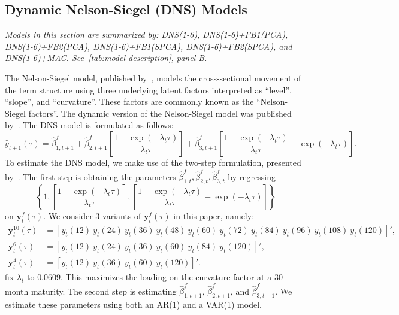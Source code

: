 \subsection{Dynamic Nelson-Siegel (DNS) Models}
\label{sec:dns}
\textit{Models in this section are summarized by: DNS(1-6), DNS(1-6)+FB1(PCA), DNS(1-6)+FB2(PCA), DNS(1-6)+FB1(SPCA), DNS(1-6)+FB2(SPCA), and DNS(1-6)+MAC. See~\cref{tab:model-description}, panel B.}

The Nelson-Siegel model, published by~\textcite{nelson_parsimonious_1987}, models the cross-sectional movement of the term structure using three underlying latent factors interpreted as \enquote{level}, \enquote{slope}, and \enquote{curvature}. 
These factors are commonly known as the \enquote{Nelson-Siegel factors}. 
The dynamic version of the Nelson-Siegel model was published by~\textcite[hereafter DNS]{diebold_forecasting_2006}. 
The DNS model is formulated as follows:
\begin{equation}
	\hat{y}_{t+1}(\tau) = \hat{\beta}_{1,t+1}^{f} + \hat{\beta}_{2,t+1}^{f} \left[\frac{1-\exp(-\lambda_t \tau)}{\lambda_t \tau}\right] + \hat{\beta}_{3,t+1}^{f} \left[\frac{1-\exp(-\lambda_t \tau)}{\lambda_t \tau} - \exp(-\lambda_t \tau)\right].
\end{equation}
To estimate the DNS model, we make use of the two-step formulation, presented by~\textcite{diebold_forecasting_2006}. 
The first step is obtaining the parameters $\hat{\beta}_{1,t}^f, \hat{\beta}_{2,t}^f, \hat{\beta}_{3,t}^f$ by regressing $$\left\{1, \left[\frac{1-\exp(-\lambda_t \tau)}{\lambda_t \tau}\right], \left[\frac{1-\exp(-\lambda_t \tau)}{\lambda_t \tau} - \exp(-\lambda_t \tau)\right] \right\}$$ on $\mathbf{y}_t^f(\tau)$.
We consider 3 variants of $\mathbf{y}_t^f(\tau)$ in this paper, namely:
\begin{align*}
	\mathbf{y}_t^{10}(\tau) &= \left[y_t(12)~y_t(24)~y_t(36)~y_t(48)~y_t(60)~y_t(72)~y_t(84)~y_t(96)~y_t(108)~y_t(120) \right]', \\
	\mathbf{y}_t^6(\tau) &= \left[y_t(12)~y_t(24)~y_t(36)~y_t(60)~y_t(84)~y_t(120) \right]', \\
	\mathbf{y}_t^4(\tau) &= \left[y_t(12)~y_t(36)~y_t(60)~y_t(120) \right]'.
\end{align*}
\textcite{diebold_forecasting_2006} fix $\lambda_t$ to $0.0609$.
This maximizes the loading on the curvature factor at a 30 month maturity. 
The second step is estimating $\hat{\beta}_{1,t+1}^{f}$, $\hat{\beta}_{2,t+1}^{f}$, and $\hat{\beta}_{3,t+1}^{f}$.
We estimate these parameters using both an AR(1) and a VAR(1) model. 
